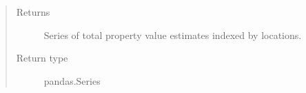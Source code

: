 \documentclass[letterpaper,10pt,english]{sphinxmanual}
\begin{document}
\begin{fulllineitems}
\begin{fulllineitems}
\begin{quote}
\begin{description}
\item[{Returns}] \leavevmode
\sphinxAtStartPar
Series of total property value estimates indexed by locations.

\item[{Return type}] \leavevmode
\sphinxAtStartPar
pandas.Series

\end{description}\end{quote}

\end{fulllineitems}


\end{fulllineitems}

\end{document}
